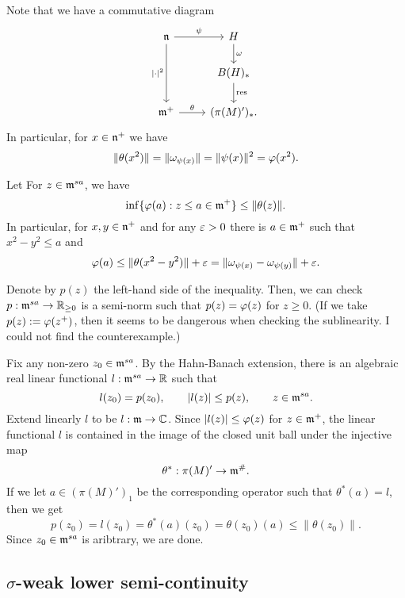 \documentclass{../../../small}
\begin{document}
Note that we have a commutative diagram
\[\begin{tikzcd}
\fn \ar{r}{\psi}\ar[swap]{dd}{|\cdot|^2} & H \ar{d}{\omega} \\
& B(H)_* \ar{d}{\mathrm{res}}\\
\fm^+ \ar{r}{\theta} & (\pi(M)')_*.
\end{tikzcd}\]
In particular, for $x\in\mathfrak{n}^+$ we have
\[\|\theta(x^2)\|=\|\omega_{\psi(x)}\|=\|\psi(x)\|^2=\varphi(x^2).\]


\begin{lem}
Let 
For $z\in\mathfrak{m}^{sa}$, we have
\[\inf\{\varphi(a):z\le a\in\mathfrak{m}^+\}\le\|\theta(z)\|.\]
In particular, for $x,y\in\mathfrak{n}^+$ and for any $\varepsilon>0$ there is $a\in\mathfrak{m}^+$ such that $x^2-y^2\le a$ and
\[\varphi(a)\le\|\theta(x^2-y^2)\|+\varepsilon=\|\omega_{\psi(x)}-\omega_{\psi(y)}\|+\varepsilon.\]
\end{lem}
\begin{pf}
Denote by $p(z)$ the left-hand side of the inequality.
Then, we can check $p:\mathfrak{m}^{sa}\to\mathbb{R}_{\ge0}$ is a semi-norm such that $p(z)=\varphi(z)$ for $z\ge0$.
(If we take $p(z):=\varphi(z^+)$, then it seems to be dangerous when checking the sublinearity. I could not find the counterexample.)

Fix any non-zero $z_0\in\mathfrak{m}^{sa}$.
By the Hahn-Banach extension, there is an algebraic real linear functional $l:\mathfrak{m}^{sa}\to\mathbb{R}$ such that
\[l(z_0)=p(z_0),\qquad |l(z)|\le p(z),\qquad z\in\mathfrak{m}^{sa}.\]
Extend linearly $l$ to be $l:\mathfrak{m}\to\mathbb{C}$.
Since $|l(z)|\le\varphi(z)$ for $z\in\mathfrak{m}^+$, the linear functional $l$ is contained in the image of the closed unit ball under the injective map
\[\theta^*:\pi(M)'\to\mathfrak{m}^\#.\]
If we let $a\in(\pi(M)')_1$ be the corresponding operator such that $\theta^*(a)=l$, then we get
\[p(z_0)=l(z_0)=\theta^*(a)(z_0)=\theta(z_0)(a)\le\|\theta(z_0)\|.\]
Since $z_0\in\mathfrak{m}^{sa}$ is aribtrary, we are done.
\end{pf}




\subsection{$\sigma$-weak lower semi-continuity}
\end{document}
